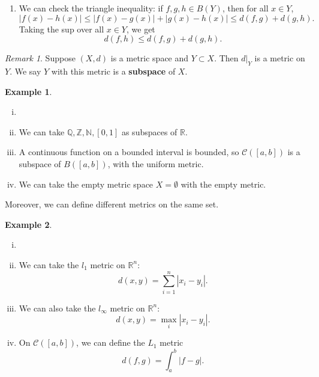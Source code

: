 \documentclass[12pt]{article}
\theoremstyle{definition}
\newtheorem{example}{Example}[section]
\theoremstyle{remark}
\newtheorem*{remark}{Remark}
\begin{document}
\begin{adjustbox}{minipage = \columnwidth - 25.5pt, margin=1em, frame=1pt, margin=0em}
	\begin{enumerate}
		\item[]
			We can check the triangle inequality: if $f, g, h \in B(Y)$, then for all $x \in Y$,
			\[
				|f(x) - h(x)| \leq |f(x) - g(x)| + |g(x) - h(x)| \leq d(f, g) + d(g, h)
			.\]
			Taking the sup over all $x \in Y$, we get
			\[
				d(f, h) \leq d(f, g) + d(g, h)
			.\]
	\end{enumerate}
\end{adjustbox}


\begin{remark}
	Suppose $(X, d)$ is a metric space and $Y \subset X$. Then $d|_{Y}$ is a metric on $Y$. We say $Y$ with this metric is a \textbf{subspace} of $X$.
\end{remark}

\begin{adjustbox}{minipage = \columnwidth - 25.5pt, margin=1em, frame=1pt, margin=0em}
\begin{example}
	\begin{enumerate}[(i)]
		\item[]
		\item We can take $\mathbb{Q}, \mathbb{Z}, \mathbb{N}, [0, 1]$ as subspaces of $\mathbb{R}$.
		\item A continuous function on a bounded interval is bounded, so $\mathcal{C}([a, b])$ is a subspace of $B([a, b])$, with the uniform metric.
		\item We can take the empty metric space $X = \emptyset$ with the empty metric.
	\end{enumerate}
\end{example}
\end{adjustbox}

Moreover, we can define different metrics on the same set.

\begin{adjustbox}{minipage = \columnwidth - 25.5pt, margin=1em, frame=1pt, margin=0em}
\begin{example}
	\begin{enumerate}[(i)]
		\item[]
		\item We can take the $l_1$ metric on $\mathbb{R}^{n}$:
			\[
				d(x, y) = \sum_{i = 1}^{n}|x_i - y_i|
			.\]
		\item We can also take the $l_{\infty}$ metric on $\mathbb{R}^{n}$:
			\[
				d(x, y) = \max_{i} |x_i - y_i|
			.\]
		\item On $\mathcal{C}([a, b])$, we can define the $L_1$ metric
			\[
				d(f, g) = \int_{a}^{b}|f - g|
			.\]
	\end{enumerate}
	
\end{example}

\end{adjustbox}
\end{document}
